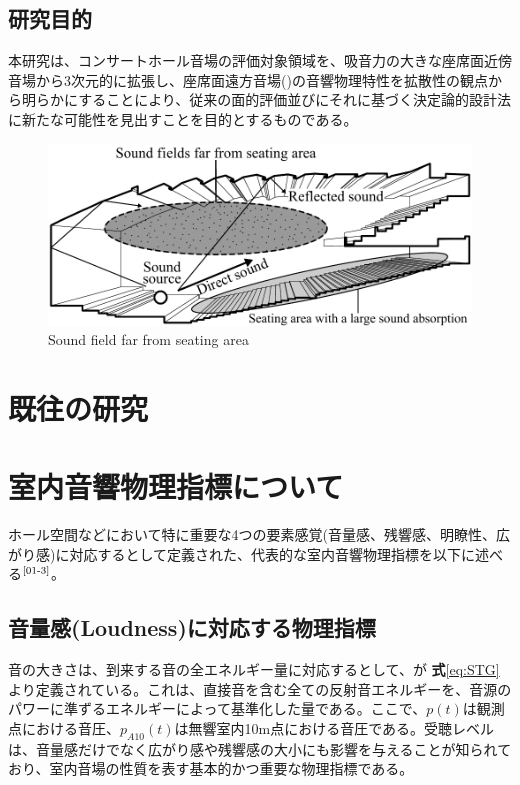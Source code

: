 \subsection{研究目的}
本研究は、コンサートホール音場の評価対象領域を、吸音力の大きな座席面近傍音場から3次元的に拡張し、座席面遠方音場()の音響物理特性を拡散性の観点から明らかにすることにより、従来の面的評価並びにそれに基づく決定論的設計法に新たな可能性を見出すことを目的とするものである。
\begin{figure}[htbp]
    \centering
    \includegraphics[keepaspectratio,scale=0.8]{01_att/zasekimen_enpo_English.pdf}
    \caption{\hspace{1mm}Sound field far from seating area}
    \label{fig:座席面遠方音場}
\end{figure}

\newpage
\section{既往の研究}

\section{室内音響物理指標について}
ホール空間などにおいて特に重要な4つの要素感覚(音量感、残響感、明瞭性、広がり感)に対応するとして定義された、代表的な室内音響物理指標を以下に述べる$^{\text{\cite{01-3}}}$。
\subsection{音量感(Loudness)に対応する物理指標}
音の大きさは、到来する音の全エネルギー量に対応するとして、\STG が \textbf{式}\ref{eq:STG}より定義されている。これは、直接音を含む全ての反射音エネルギーを、音源のパワーに準ずるエネルギーによって基準化した量である。ここで、$p(t)$は観測点における音圧、$p_{A10}(t)$は無響室内10m点における音圧である。受聴レベルは、音量感だけでなく広がり感や残響感の大小にも影響を与えることが知られており、室内音場の性質を表す基本的かつ重要な物理指標である。

